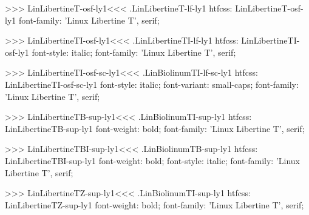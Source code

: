 {{{>>>
\<LinLibertineT-osf-ly1\><<<
.LinLibertineT-lf-ly1
htfcss:  LinLibertineT-osf-ly1  font-family: 'Linux Libertine T', serif;

>>>
\<LinLibertineTI-osf-ly1\><<<
.LinLibertineTI-lf-ly1
htfcss:  LinLibertineTI-osf-ly1  font-style: italic; font-family: 'Linux Libertine T', serif;

>>>
\<LinLibertineTI-osf-sc-ly1\><<<
.LinBiolinumTI-lf-sc-ly1
htfcss:  LinLibertineTI-osf-sc-ly1  font-style: italic; font-variant: small-caps; font-family: 'Linux Libertine T', serif;

>>>
\<LinLibertineTB-sup-ly1\><<<
.LinBiolinumTI-sup-ly1
htfcss:  LinLibertineTB-sup-ly1  font-weight: bold; font-family: 'Linux Libertine T', serif;

>>>
\<LinLibertineTBI-sup-ly1\><<<
.LinBiolinumTB-sup-ly1
htfcss:  LinLibertineTBI-sup-ly1  font-weight: bold; font-style: italic; font-family: 'Linux Libertine T', serif;

>>>
\<LinLibertineTZ-sup-ly1\><<<
.LinBiolinumTI-sup-ly1
htfcss:  LinLibertineTZ-sup-ly1  font-weight: bold; font-family: 'Linux Libertine T', serif;

}}}
